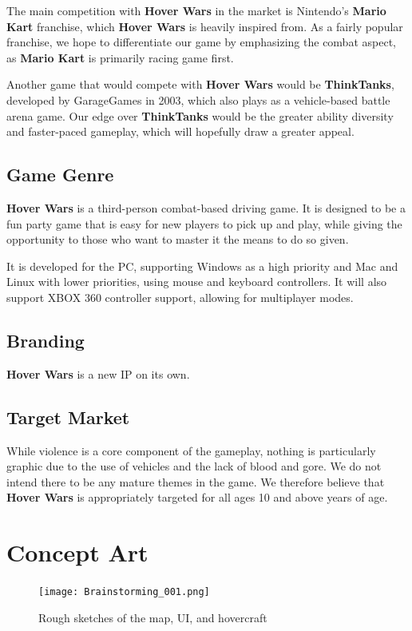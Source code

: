 \documentclass{article}
\newcommand{\namenobold}{Hover Wars}
\newcommand{\name}{\textbf{\namenobold}}
\theoremstyle{definition}
\begin{document}
The main competition with \name{} in the market is Nintendo's \textbf{Mario Kart}
franchise, which \name{} is heavily inspired from. As a fairly popular
franchise, we hope to differentiate our game by emphasizing the combat aspect,
as \textbf{Mario Kart} is primarily racing game first.

Another game that would compete with \name{} would be \textbf{ThinkTanks},
developed by GarageGames in 2003, which also plays as a vehicle-based battle
arena game. Our edge over \textbf{ThinkTanks} would be the greater ability
diversity and faster-paced gameplay, which will hopefully draw a greater
appeal.

\subsection{Game Genre} %

\name{} is a third-person combat-based driving game. It is designed to be
a fun party game that is easy for new players to pick up and play, while giving
the opportunity to those who want to master it the means to do so given.

It is developed for the PC, supporting Windows as a high priority and Mac and
Linux with lower priorities, using mouse and keyboard controllers. It will also
support XBOX 360 controller support, allowing for multiplayer modes.

\subsection{Branding}

\name{} is a new IP on its own.

\subsection{Target Market}

While violence is a core component of the gameplay, nothing is particularly
graphic due to the use of vehicles and the lack of blood and gore. We do not
intend there to be any mature themes in the game. We therefore believe that
\name{} is appropriately targeted for all ages 10 and above years of age.

\section{Concept Art}

\begin{figure}[htpb]
  \centering
  \texttt{[image: Brainstorming\_001.png]}
  \caption{Rough sketches of the map, UI, and hovercraft}
\label{fig:Brainstorming_001}
\end{figure}
\end{document}
